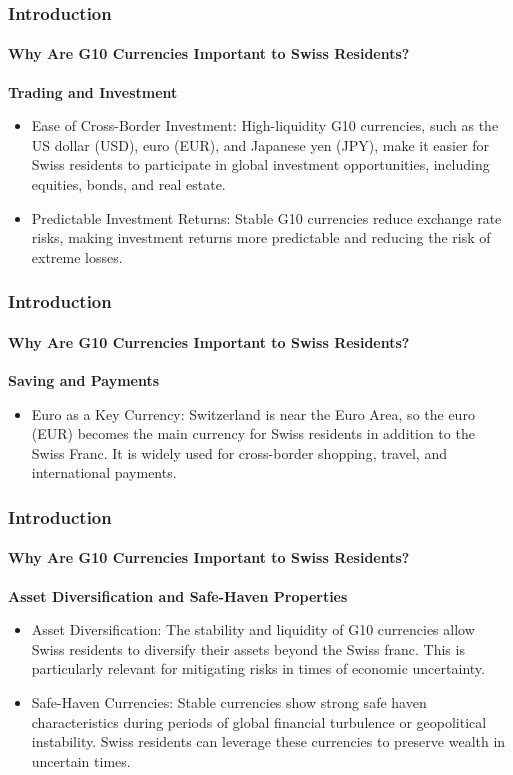 \documentclass[10pt]{beamer}
\begin{document}
\begin{frame}
\frametitle{Introduction}
\framesubtitle{Why Are G10 Currencies Important to Swiss Residents?}
\textbf{Trading and Investment}
\begin{itemize}
    \item Ease of Cross-Border Investment: High-liquidity G10 currencies, such as the US dollar (USD), euro (EUR), and Japanese yen (JPY), make it easier for Swiss residents to participate in global investment opportunities, including equities, bonds, and real estate.
    \item Predictable Investment Returns: Stable G10 currencies reduce exchange rate risks, making investment returns more predictable and reducing the risk of extreme losses.
\end{itemize}
\end{frame}
\begin{frame}
\frametitle{Introduction}
\framesubtitle{Why Are G10 Currencies Important to Swiss Residents?}
\textbf{Saving and Payments}
\begin{itemize}
    \item Euro as a Key Currency: Switzerland is near the Euro Area, so the euro (EUR) becomes the main currency for Swiss residents in addition to the Swiss Franc. It is widely used for cross-border shopping, travel, and international payments.
\end{itemize}
\end{frame}
\begin{frame}
\frametitle{Introduction}
\framesubtitle{Why Are G10 Currencies Important to Swiss Residents?}
\textbf{Asset Diversification and Safe-Haven Properties}   
\begin{itemize}
    \item Asset Diversification: The stability and liquidity of G10 currencies allow Swiss residents to diversify their assets beyond the Swiss franc. This is particularly relevant for mitigating risks in times of economic uncertainty.
    \item Safe-Haven Currencies: Stable currencies show strong safe haven characteristics during periods of global financial turbulence or geopolitical instability. Swiss residents can leverage these currencies to preserve wealth in uncertain times.
\end{itemize}
\end{frame}
\end{document}
